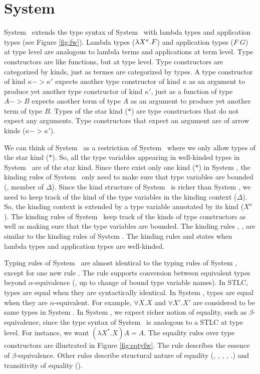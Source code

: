 \section{System \Fw} \label{sec:fw}
System \Fw\ extends the type syntax of System \F\ with lambda types and
application types (see Figure \ref{fig:fw}). Lambda types ($\lambda X^\kappa.F$)
and application types ($F\;G$) at type level are analogous to lambda terms
and applications at term level. Type constructors are like functions, but
at type level. Type constructors are categorized by kinds, just as termes
are categorized by types. A type constructor of kind $\kappa -> \kappa'$
expects another type constructor of kind $\kappa$ as an argument to produce
yet another type constructor of kind $\kappa'$, just as a function of type
$A -> B$ expects another term of type $A$ as an argument to produce yet another
term of type $B$. Types of the star kind ($*$) are type constructors that
do not expect any arguments. Type constructors that expect an argument
are of arrow kinds ($\kappa -> \kappa'$).

We can think of System \F\ as a restriction of System \Fw\ where we only
allow types of the star kind ($*$). So, all the type variables appearing in
well-kinded types in System \F\ are of the star kind. Since there exist only
one kind ($*$) in System \F, the kinding rules of System \F\ only need to make
sure that type variables are bounded (\ie, member of $\Delta$). 
Since the kind structure of System \Fw\ is richer than System \F, we need to
keep track of the kind of the type variables in the kinding context ($\Delta$).
So, the kinding context is extended by a type variable annotated by its kind
($X^\kappa$). The kinding rules of System \Fw\ keep track of the kinds of
type constructors as well as making sure that the type variables are bounded.
The kinding rules , , 
are similar to the kinding rules of System \F. The kinding rules
 and  states when lambda types and
application types are well-kinded.

Typing rules of System \Fw\ are almost identical to the typing rules of
System \F, except for one new rule . The  rule
supports conversion between equivalent types beyond $\alpha$-equivalence
(\ie, up to change of bound type variable names).
In STLC, types are equal when they are syntactically identical.
In System \F, types are equal when they are $\alpha$-equivalent. For example,
$\forall X.X$ and $\forall X'.X'$ are considered to be same types in System \F.
In System \Fw, we expect richer notion of equality, such as $\beta$-equivalence,
since the type syntax of System \Fw\ is analogous to a STLC at type level.
For instance, we want $(\lambda X^{*}.X) A = A$. The equality rules over
type constructors are illustrated in Figure \ref{fig:eqtyfw}.
The  rule describes the essence of $\beta$-equivalence.
Other rules describe structural nature of equality (,
, , , .)
and transitivity of equality ().

